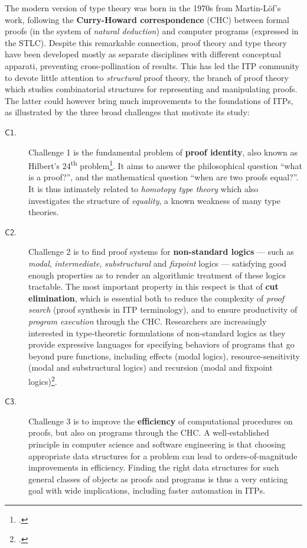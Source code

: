 \documentclass[11pt]{msca-pf}
\newcommand{\CH}[1]{$\mathsf{C#1}$}
\begin{document}
The modern version of type theory was born in the 1970s from Martin-Löf's work, following the
\textbf{Curry-Howard correspondence} (CHC) between formal proofs (in the system of \emph{natural
deduction}) and computer programs (expressed in the STLC). Despite this remarkable connection, proof
theory and type theory have been developed mostly as separate disciplines with different conceptual
apparati, preventing cross-pollination of results. This has led the ITP community to devote little
attention to \emph{structural} proof theory, the branch of proof theory which studies combinatorial
structures for representing and manipulating proofs. The latter could however bring much
improvements to the foundations of ITPs, as illustrated by the three broad challenges that motivate
its study:
\begin{description}
    \item[\CH{1}.] Challenge 1 is the fundamental problem of \textbf{proof identity}, also
    known as Hilbert's 24\textsuperscript{th} problem\footcite{strasburger-problem-2019}. It aims to
    answer the philosophical question ``what is a proof?'', and the mathematical question ``when are
    two proofs equal?''. It is thus intimately related to \emph{homotopy type theory} which also
    investigates the structure of \emph{equality}, a known weakness of many type theories.

    \item[\CH{2}.] Challenge 2 is to find proof systems for \textbf{non-standard logics} --- such as
    \emph{modal}, \emph{intermediate}, \emph{substructural} and \emph{fixpoint} logics ---
    satisfying good enough properties as to render an algorithmic treatment of these logics
    tractable. The most important property in this respect is that of \textbf{cut elimination},
    which is essential both to reduce the complexity of \emph{proof search} (proof synthesis in ITP
    terminology), and to ensure productivity of \emph{program execution} through the CHC.
    Researchers are increasingly interested in type-theoretic formulations of non-standard logics as
    they provide expressive languages for specifying behaviors of programs that go beyond pure
    functions, including effects (modal logics), resource-sensitivity (modal and substructural
    logics) and recursion (modal and fixpoint
    logics)\footcite{tangModalEffectTypes2025,marshallLinearityUniquenessEntente2022,cloustonGuardedLambdaCalculusProgramming2017}.
    
    \item[\CH{3}.] Challenge 3 is to improve the \textbf{efficiency} of computational
    procedures on proofs, but also on programs through the CHC. A well-established principle in
    computer science and software engineering is that choosing appropriate data structures for a
    problem can lead to orders-of-magnitude improvements in efficiency. Finding the right data
    structures for such general classes of objects as proofs and programs is thus a very enticing
    goal with wide implications, including faster automation in ITPs.
\end{description}
\end{document}
